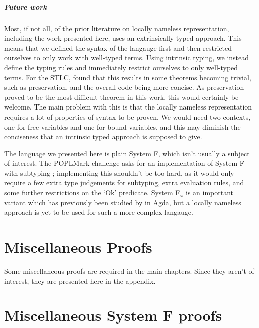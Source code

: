 \documentclass[logo,bsc,singlespacing,parskip,online]{infthesis}
\begin{document}
\paragraph*{Future work} Most, if not all, of the prior literature on locally nameless
representation, including the work presented here, uses an extrinsically typed approach. This means
that we defined the syntax of the langauge first and then restricted ourselves to only work with
well-typed terms. Using intrinsic typing, we instead define the typing rules and immediately
restrict ourselves to only well-typed terms. For the STLC,
\citet[chapter~De~Bruijn]{wadler_programming_2022} found that this results in some theorems becoming
trivial, such as preservation, and the overall code being more concise. As preservation proved to be
the most difficult theorem in this work, this would certainly be welcome. The main problem with this
is that the locally nameless representation requires a lot of properties of syntax to be proven. We
would need two contexts, one for free variables and one for bound variables, and this may diminish
the conciseness that an intrinsic typed approach is supposed to give.

The language we presented here is plain System F, which isn't usually a subject of interest. The
POPLMark challenge asks for an implementation of System F with subtyping
\citep{chargueraud_locally_2012}; implementing this shouldn't be too hard, as it would only require
a few extra type judgements for subtyping, extra evaluation rules, and some further restrictions on
the `Ok' predicate. System F$_\omega$ is an important variant which has previously been studied by
\citet{hutton_system_2019} in Agda, but a locally nameless approach is yet to be used for such a
more complex langauge.




\appendix

\chapter{Miscellaneous Proofs}
\label{appendix:misc_proofs}

Some miscellaneous proofs are required in the main chapters. Since they aren't of interest, they are presented here in the appendix.



\chapter{Miscellaneous System F proofs}
\end{document}
